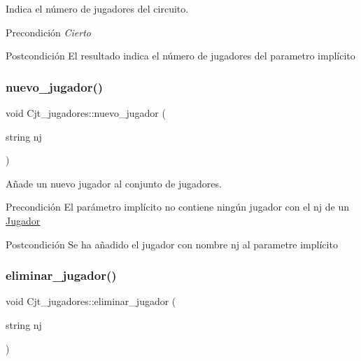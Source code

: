 Indica el número de jugadores del circuito. 

\begin{DoxyPrecond}{Precondición}
{\itshape Cierto} 
\end{DoxyPrecond}
\begin{DoxyPostcond}{Postcondición}
El resultado indica el número de jugadores del parametro implícito 
\end{DoxyPostcond}
\mbox{\label{class_cjt__jugadores_a99640dbf83c833ed484d1bc31a36ede1}} 
\subsubsection{\texorpdfstring{nuevo\+\_\+jugador()}{nuevo\_jugador()}}
{\footnotesize\ttfamily void Cjt\+\_\+jugadores\+::nuevo\+\_\+jugador (\begin{DoxyParamCaption}\item[{string}]{nj }\end{DoxyParamCaption})}



Añade un nuevo jugador al conjunto de jugadores. 

\begin{DoxyPrecond}{Precondición}
El parámetro implícito no contiene ningún jugador con el nj de un \hyperlink{class_jugador}{Jugador} 
\end{DoxyPrecond}
\begin{DoxyPostcond}{Postcondición}
Se ha añadido el jugador con nombre nj al parametre implícito 
\end{DoxyPostcond}
\mbox{\label{class_cjt__jugadores_ac0783e7a2a952975cd339f69cb040b30}} 
\subsubsection{\texorpdfstring{eliminar\+\_\+jugador()}{eliminar\_jugador()}}
{\footnotesize\ttfamily void Cjt\+\_\+jugadores\+::eliminar\+\_\+jugador (\begin{DoxyParamCaption}\item[{string}]{nj }\end{DoxyParamCaption})}




